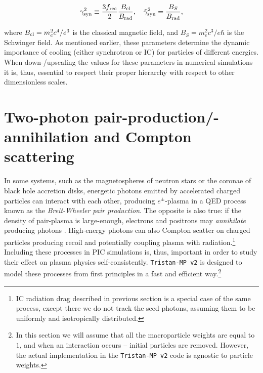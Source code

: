 \begin{equation}
    \gamma_{\rm syn}^2\equiv \frac{3 f_{\rm rec}}{2}\frac{B_{\rm cl}}{B_{\rm rad}},~~~\tilde{\gamma}_{\rm syn}^2 = \frac{B_S}{B_{\rm rad}},
\end{equation}

\noindent where $B_{\rm cl} = m_e^2 c^4 / e^3$ is the classical magnetic field, and $B_S = m_e^2 c^3 / e \hbar$ is the Schwinger field. As mentioned earlier, these parameters determine the dynamic importance of cooling (either synchrotron or IC) for particles of different energies. When down-/upscaling the values for these parameters in numerical simulations it is, thus, essential to respect their proper hierarchy with respect to other dimensionless scales.

\section{Two-photon pair-production/-annihilation and Compton scattering}
\label{sec:num-QED}

In some systems, such as the magnetospheres of neutron stars or the coronae of black hole accretion disks, energetic photons emitted by accelerated charged particles can interact with each other, producing $e^\pm$-plasma in a QED process known as the \emph{Breit-Wheeler pair production}. The opposite is also true: if the density of pair-plasma is large-enough, electrons and positrons may \emph{annihilate} producing photons \citep[see, e.g.,][]{1987MNRAS.227..403S, 1996A&A...311..172L, 2017ApJ...850..141B, 2020arXiv201107310B}. High-energy photons can also Compton scatter on charged particles producing recoil and potentially coupling plasma with radiation.\footnote{IC radiation drag described in previous section is a special case of the same process, except there we do not track the seed photons, assuming them to be uniformly and isotropically distributed.} Including these processes in PIC simulations is, thus, important in order to study their effect on plasma physics self-consistently. \texttt{Tristan-MP v2} is designed to model these processes from first principles in a fast and efficient way.\footnote{In this section we will assume that all the macroparticle weights are equal to $1$, and when an interaction occurs -- initial particles are removed. However, the actual implementation in the \texttt{Tristan-MP v2} code is agnostic to particle weights.}

